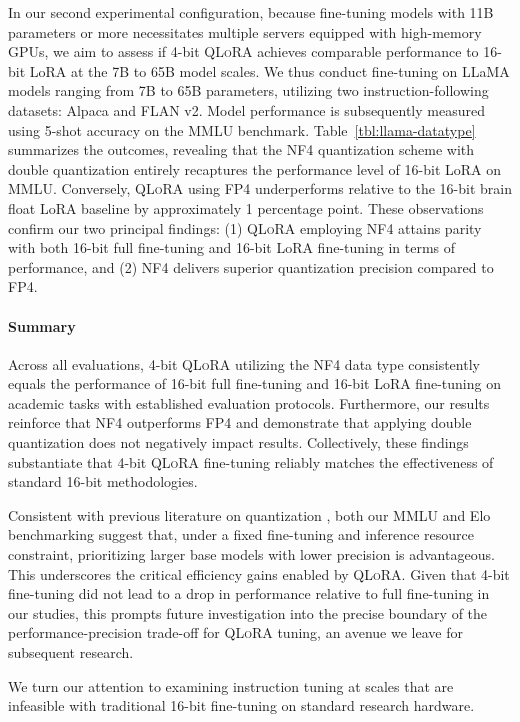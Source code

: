 In our second experimental configuration, because fine-tuning models with 11B parameters or more necessitates multiple servers equipped with high-memory GPUs, we aim to assess if 4-bit \textsc{QLoRA} achieves comparable performance to 16-bit LoRA at the 7B to 65B model scales. We thus conduct fine-tuning on LLaMA models ranging from 7B to 65B parameters, utilizing two instruction-following datasets: Alpaca and FLAN v2. Model performance is subsequently measured using 5-shot accuracy on the MMLU benchmark. Table~\ref{tbl:llama-datatype} summarizes the outcomes, revealing that the NF4 quantization scheme with double quantization entirely recaptures the performance level of 16-bit LoRA on MMLU. Conversely, \textsc{QLoRA} using FP4 underperforms relative to the 16-bit brain float LoRA baseline by approximately 1 percentage point. These observations confirm our two principal findings: (1) \textsc{QLoRA} employing NF4 attains parity with both 16-bit full fine-tuning and 16-bit LoRA fine-tuning in terms of performance, and (2) NF4 delivers superior quantization precision compared to FP4.

\paragraph{Summary} Across all evaluations, 4-bit \textsc{QLoRA} utilizing the NF4 data type consistently equals the performance of 16-bit full fine-tuning and 16-bit LoRA fine-tuning on academic tasks with established evaluation protocols. Furthermore, our results reinforce that NF4 outperforms FP4 and demonstrate that applying double quantization does not negatively impact results. Collectively, these findings substantiate that 4-bit \textsc{QLoRA} fine-tuning reliably matches the effectiveness of standard 16-bit methodologies.

Consistent with previous literature on quantization \citep{dettmers2022case}, both our MMLU and Elo benchmarking suggest that, under a fixed fine-tuning and inference resource constraint, prioritizing larger base models with lower precision is advantageous. This underscores the critical efficiency gains enabled by \textsc{QLoRA}. Given that 4-bit fine-tuning did not lead to a drop in performance relative to full fine-tuning in our studies, this prompts future investigation into the precise boundary of the performance-precision trade-off for \textsc{QLoRA} tuning, an avenue we leave for subsequent research.

We turn our attention to examining instruction tuning at scales that are infeasible with traditional 16-bit fine-tuning on standard research hardware.

